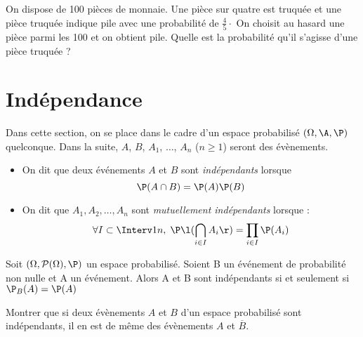 \documentclass[a4paper,10pt]{report}
\begin{document}
\begin{itemize}
\begin{itemize}
\begin{Exemple}
\vspace{6cm}
\end{Exemple}

\newpage

$\phantom{test}$

\vspace{4cm}

\begin{ApplicationDirecte} On dispose de 100 pièces de monnaie. Une pièce sur quatre est truquée et une pièce truquée indique pile avec une probabilité de $\frac{4}{5} \cdot$ On choisit au hasard une pièce parmi les 100 et on obtient pile. Quelle est la probabilité qu'il s'agisse d'une pièce truquée ?
\end{ApplicationDirecte}

\section{Indépendance}
Dans cette section, on se place dans le cadre d'un espace probabilisé $(\Omega, \A, \P)$ quelconque. Dans la suite, $A$, $B$, $A_1$, $\ldots$, $A_n$ ($n \geq 1$) seront des évènements.



\begin{Definition}{}
\begin{itemize}
 \item On dit que deux événements $A$ et $B$ sont \emph{indépendants} lorsque 
$$\P(A \cap B)= \P(A)\P(B)$$
 \item On dit que $A_1,A_2,\ldots,A_n$ sont \emph{mutuellement indépendants} lorsque :
$$\forall I \subset \Interv 1n,\;\P\l(\bigcap_{i \in I}A_i\r)= \prod_{i \in I}\P(A_i)$$
\end{itemize}
\end{Definition}

\begin{Proposition}{}
Soit $(\Omega,\mathcal{P}(\Omega),\P)$ un espace probabilisé. Soient B un événement de probabilité non nulle et A un événement. Alors A et B sont indépendants si et seulement si $\P_B(A)=\P(A)$
\end{Proposition}

\begin{Demonstration}{}

\vspace{4cm}
\end{Demonstration}

\begin{ApplicationDirecte} Montrer que si deux évènements $A$ et $B$ d'un espace probabilisé sont indépendants, il en est de même des évènements $A$ et $\overline{B}$.
\end{ApplicationDirecte}




\end{itemize}
\end{itemize}
\end{document}
